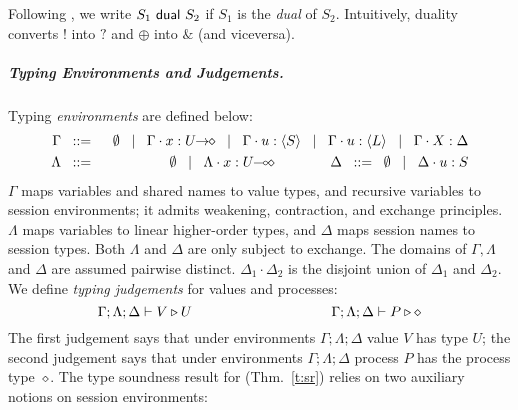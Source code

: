\documentclass[a4paper,UKenglish]{lipics}
\theoremstyle{definition}
\begin{document}

Following \cite{onSessionDualityBDGK},
we write $S_1 \ \mathsf{dual}\  S_2$ if 
$S_1$ is the \emph{dual} of $S_2$.   
Intuitively, 
duality
converts $!$ into $?$ and $\oplus$ into $\&$ (and viceversa). 

 

\subparagraph{Typing Environments and Judgements.}
\noi Typing \emph{environments} are defined below:
\begin{eqnarray*}
	\Gamma  & \bnfis  &\emptyset \bnfbar \Gamma \cat \varp{x}: \shot{U} \bnfbar \Gamma \cat u: \chtype{S} \bnfbar \Gamma \cat u: \chtype{L} 
        \bnfbar \Gamma \cat \rvar{X}: \Delta \\
	\Lambda &\bnfis & \emptyset \bnfbar \Lambda \cat \AT{x}{\lhot{U}}
	\qquad\qquad
	\Delta  \bnfis  \emptyset \bnfbar \Delta \cat \AT{u}{S}
\end{eqnarray*}
\noi 
$\Gamma$ maps variables and shared names to value types, and recursive 
variables to session environments;  
it admits weakening, contraction, and exchange principles.
$\Lambda$ maps variables to 
 linear %
higher-order
types, and $\Delta$ maps
session names to session types. 
Both $\Lambda$ and $\Delta$ %
are
only subject to exchange.  
The domains of $\Gamma,
\Lambda$ and $\Delta$ are assumed pairwise distinct. 
$\Delta_1\cdot \Delta_2$ is 
the disjoint union of $\Delta_1$ and $\Delta_2$.  
We define \emph{typing judgements} for values 
and processes: %
	$$\Gamma; \Lambda; \Delta \vdash V \triangleright U \qquad \qquad \qquad \qquad \qquad \Gamma; \Lambda; \Delta \vdash P \triangleright \diamond$$
\noi The first judgement
says that under environments $\Gamma; \Lambda; \Delta$ value $V$
has type $U$; the second judgement says that under
environments $\Gamma; \Lambda; \Delta$ process $P$ has the process type~$\diamond$.
The type soundness result for \HOp (Thm.~\ref{t:sr})
relies on two auxiliary notions on session environments: 
\end{document}

